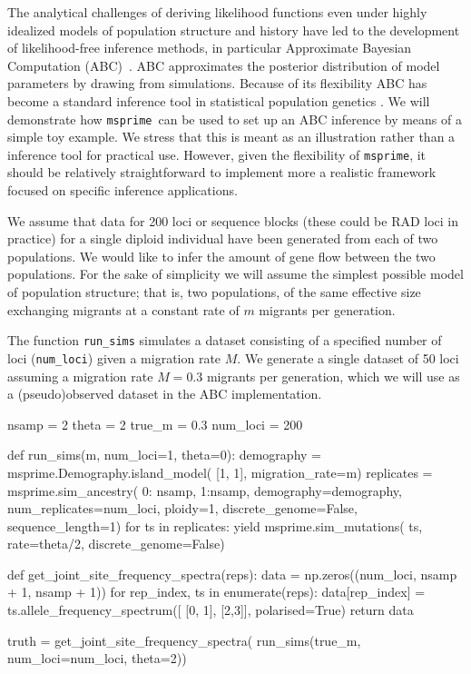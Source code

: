 \documentclass[graybox]{svmult}
\newcommand{\msprime}[0]{\texttt{msprime}}
\begin{document}
    The analytical challenges of deriving likelihood functions even under
highly idealized models of population structure and history have led to
the development of likelihood-free inference methods, in particular
Approximate Bayesian Computation (ABC)~\citep{Beaumont2002}.
ABC approximates the posterior distribution of model parameters by drawing from
simulations. Because of its flexibility ABC has become a standard
inference tool in statistical population genetics \citep[see][for a review]{csillery2010approximate}.
We will demonstrate how \msprime\ can be used to set up an ABC inference
by means of a simple toy example. We stress that this is meant as an
illustration rather than a inference tool for practical use. However,
given the flexibility of \msprime, it should be
relatively straightforward to implement more a realistic framework focused
on specific inference applications.

We assume that data for 200 loci or sequence blocks (these could be RAD
loci in practice) for a single diploid individual have been generated
from each of two populations. We would like to infer the amount of gene
flow between the two populations. For the sake of simplicity we will
assume the simplest possible model of population structure; that is, two
populations, of the same effective size exchanging migrants at a
constant rate of $m$ migrants per generation.

The function \texttt{run\_sims} simulates a dataset consisting of a
specified number of loci (\texttt{num\_loci}) given a migration rate
\(M\). We generate a single dataset of 50 loci assuming a migration rate
\(M=0.3\) migrants per generation, which we will use as a (pseudo)observed dataset in the ABC
implementation.

\begin{pythoncode}
nsamp = 2
theta = 2
true_m = 0.3
num_loci = 200

def run_sims(m, num_loci=1, theta=0):
    demography = msprime.Demography.island_model(
        [1, 1], migration_rate=m)
    replicates = msprime.sim_ancestry(
        {0: nsamp, 1:nsamp}, demography=demography,
        num_replicates=num_loci, ploidy=1,
        discrete_genome=False, sequence_length=1)
    for ts in replicates:
        yield msprime.sim_mutations(
            ts, rate=theta/2, discrete_genome=False)

def get_joint_site_frequency_spectra(reps):
    data = np.zeros((num_loci, nsamp + 1, nsamp + 1))
    for rep_index, ts in enumerate(reps):
        data[rep_index] = ts.allele_frequency_spectrum([
            [0, 1], [2,3]], polarised=True)
    return data

truth = get_joint_site_frequency_spectra(
    run_sims(true_m, num_loci=num_loci, theta=2))
\end{pythoncode}
\end{document}
